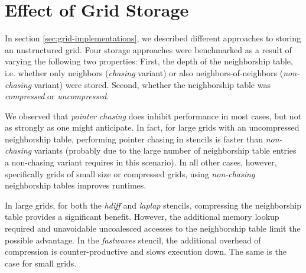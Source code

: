\section{Effect of Grid Storage} \label{sec:res-storage}

In section \ref{sec:grid-implementations}, we described different approaches to storing an unstructured grid. Four storage approaches were benchmarked as a result of varying the following two properties: First, the depth of the neighborship table, i.e. whether only neighbors (\emph{chasing} variant) or also neighbors-of-neighbors (\emph{non-chasing} variant) were stored. Second, whether the neighborship table was \emph{compressed} or \emph{uncompressed}.

We observed that \emph{pointer chasing} does inhibit performance in most cases, but not as strongly as one might anticipate. In fact, for large grids with an uncompressed neighborship table, performing pointer chasing in stencils is faster than \emph{non-chasing} variants (probably due to the large number of neighborship table entries a non-chasing variant requires in this scenario). In all other cases, however, specifically grids of small size or compressed grids, using \emph{non-chasing} neighborship tables improves runtimes.

In large grids, for both the \emph{hdiff} and \emph{laplap} stencils, compressing the neighborship table provides a significant benefit. However, the additional memory lookup required and unavoidable uncoalesced accesses to the neighborship table limit the possible advantage. In the \emph{fastwaves} stencil, the additional overhead of compression is counter-productive and slows execution down. The same is the case for small grids.

